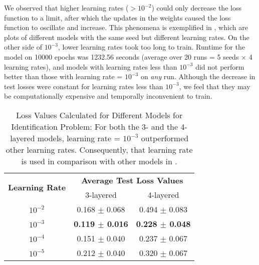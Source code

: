 We observed that higher learning rates ($>10^{-2}$) could only decrease the loss function to a limit, after which the updates in the weights caused the loss function to oscillate and increase. This phenomena is exemplified in , which are plots of different models with the same seed but different learning rates. On the other side of $10^{-3}$, lower learning rates took too long to train. Runtime for the model on 10000 epochs was 1232.56 seconds (average over 20 runs = 5 seeds $\times$ 4 learning rates), and models with learning rates less than $10^{-3}$ did not perform better than those with learning rate = $10^{-3}$ on \textit{any} run. Although the decrease in test losses were constant for learning rates less than $10^{-3}$, we feel that they may be computationally expensive and temporally inconvenient to train.
\begin{table}[!htbp]
    \centering
    \caption[Loss Values Calculated for Different Models for Identification Problem]{Loss Values Calculated for Different Models for Identification Problem: For both the 3- and the 4-layered models, learning rate = $10^{-3}$ outperformed other learning rates. Consequently, that learning rate is used in comparison with other models in .}
    \label{tab:Loss Values Calculated for Different Models for Identification Problem}
    \begin{tabular}{c | c | c}
        \hline
        \multirow{2}{*}{\textbf{Learning Rate}} & \multicolumn{2}{c}{\textbf{Average Test Loss Values}} \\
        & 3-layered & 4-layered\\
        \hline
        $10^{-2}$ & 0.168 $\pm$ 0.068 & 0.494 $\pm$ 0.083\\
        $10^{-3}$ & \textbf{0.119 $\pm$ 0.016} & \textbf{0.228 $\pm$ 0.048}\\
        $10^{-4}$ & 0.151 $\pm$ 0.040 & 0.237 $\pm$ 0.067\\
        $10^{-5}$ & 0.212 $\pm$ 0.040 & 0.320 $\pm$ 0.067\\
        \hline
    \end{tabular}
\end{table}

